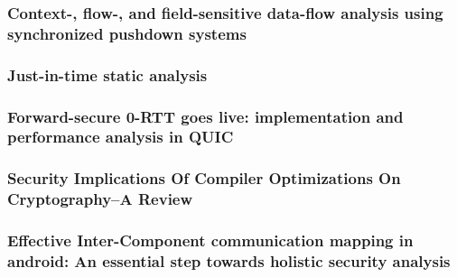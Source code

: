 \documentclass{beamer}
\begin{document}
\begin{frame}[plain]
\frametitle{Context-, flow-, and field-sensitive data-flow analysis using synchronized pushdown systems}
\end{frame}
\begin{frame}[plain]
\frametitle{Just-in-time static analysis}
\end{frame}
\begin{frame}[plain]
\frametitle{Forward-secure 0-RTT goes live: implementation and performance analysis in QUIC}
\end{frame}
\begin{frame}[plain]
\frametitle{Security Implications Of Compiler Optimizations On Cryptography--A Review}
\end{frame}
\begin{frame}[plain]
\frametitle{Effective {Inter-Component} communication mapping in android: An essential step towards holistic security analysis}
\end{frame}
\end{document}
